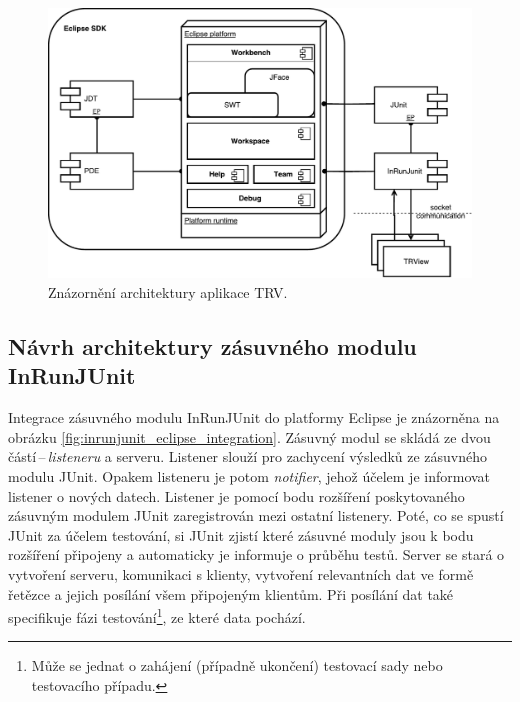   \begin{figure}[h]
    \includegraphics[width=\textwidth, center]{obrazky-figures/TRV_architecture.pdf}
    \caption{Znázornění architektury aplikace TRV.}
    \label{fig:TRV_architecture}
  \end{figure}

    \subsection{Návrh architektury zásuvného modulu InRunJUnit}
    Integrace zásuvného modulu InRunJUnit do platformy Eclipse je znázorněna na obrázku \ref{fig:inrunjunit_eclipse_integration}. Zásuvný modul se skládá ze dvou částí\,--\,\emph{listeneru} a serveru. Listener slouží pro zachycení výsledků ze zásuvného modulu JUnit. Opakem listeneru je potom \emph{notifier}, jehož účelem je informovat listener o nových datech. Listener je pomocí bodu rozšíření poskytovaného zásuvným modulem JUnit zaregistrován mezi ostatní listenery. Poté, co se spustí JUnit za účelem testování, si JUnit zjistí které zásuvné moduly jsou k bodu rozšíření připojeny a automaticky je informuje o průběhu testů. Server se stará o vytvoření serveru, komunikaci s klienty, vytvoření relevantních dat ve formě řetězce a jejich posílání všem připojeným klientům. Při posílání dat také specifikuje fázi testování\footnote{Může se jednat o zahájení (případně ukončení) testovací sady nebo testovacího případu.}, ze které data pochází.

